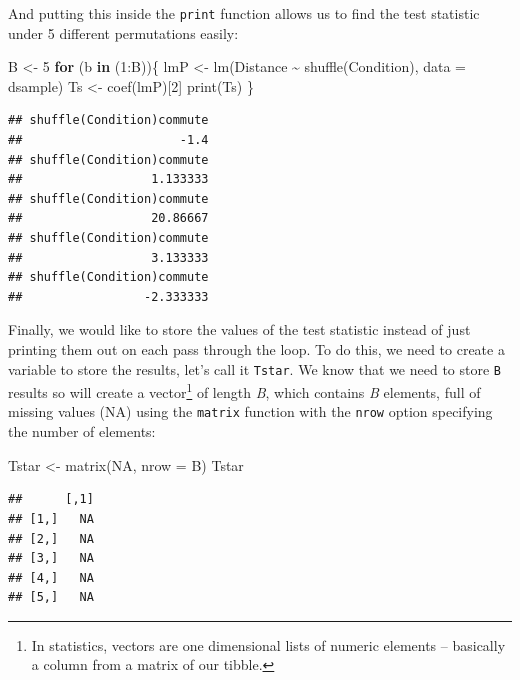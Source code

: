 \documentclass[
]{book}
\newenvironment{Shaded}{\begin{snugshade}}{\end{snugshade}}
\newcommand{\AttributeTok}[1]{\textcolor[rgb]{0.77,0.63,0.00}{#1}}
\newcommand{\ConstantTok}[1]{\textcolor[rgb]{0.00,0.00,0.00}{#1}}
\newcommand{\ControlFlowTok}[1]{\textcolor[rgb]{0.13,0.29,0.53}{\textbf{#1}}}
\newcommand{\DecValTok}[1]{\textcolor[rgb]{0.00,0.00,0.81}{#1}}
\newcommand{\FunctionTok}[1]{\textcolor[rgb]{0.00,0.00,0.00}{#1}}
\newcommand{\NormalTok}[1]{#1}
\newcommand{\OtherTok}[1]{\textcolor[rgb]{0.56,0.35,0.01}{#1}}
\newcommand{\SpecialCharTok}[1]{\textcolor[rgb]{0.00,0.00,0.00}{#1}}
\begin{document}
And putting this inside the \texttt{print} function allows us to find the test
statistic under 5 different permutations easily:

\begin{Shaded}
\begin{Highlighting}[]
\NormalTok{B }\OtherTok{\textless{}{-}} \DecValTok{5}
\ControlFlowTok{for}\NormalTok{ (b }\ControlFlowTok{in}\NormalTok{ (}\DecValTok{1}\SpecialCharTok{:}\NormalTok{B))\{}
\NormalTok{  lmP }\OtherTok{\textless{}{-}} \FunctionTok{lm}\NormalTok{(Distance }\SpecialCharTok{\textasciitilde{}} \FunctionTok{shuffle}\NormalTok{(Condition), }\AttributeTok{data =}\NormalTok{ dsample)}
\NormalTok{  Ts }\OtherTok{\textless{}{-}} \FunctionTok{coef}\NormalTok{(lmP)[}\DecValTok{2}\NormalTok{]}
  \FunctionTok{print}\NormalTok{(Ts)}
\NormalTok{\}}
\end{Highlighting}
\end{Shaded}

\begin{verbatim}
## shuffle(Condition)commute 
##                      -1.4 
## shuffle(Condition)commute 
##                  1.133333 
## shuffle(Condition)commute 
##                  20.86667 
## shuffle(Condition)commute 
##                  3.133333 
## shuffle(Condition)commute 
##                 -2.333333
\end{verbatim}

Finally, we would like to store the values of the test statistic instead of
just printing them out on each pass through the loop. To do this, we need to
create a variable to store the results, let's call it \texttt{Tstar}. We know that
we need to store \texttt{B} results so will create a vector\footnote{In statistics, vectors are one dimensional lists of numeric elements -- basically a column from a matrix of our tibble.} of length \emph{B}, which
contains \emph{B} elements, full of missing values (NA) using the \texttt{matrix}  function with the \texttt{nrow} option specifying the number of elements:

\begin{Shaded}
\begin{Highlighting}[]
\NormalTok{Tstar }\OtherTok{\textless{}{-}} \FunctionTok{matrix}\NormalTok{(}\ConstantTok{NA}\NormalTok{, }\AttributeTok{nrow =}\NormalTok{ B)}
\NormalTok{Tstar}
\end{Highlighting}
\end{Shaded}

\begin{verbatim}
##      [,1]
## [1,]   NA
## [2,]   NA
## [3,]   NA
## [4,]   NA
## [5,]   NA
\end{verbatim}
\end{document}

